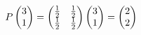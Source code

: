 \documentclass[preview]{standalone}
\begin{document}
\begin{align*}
\special{dvisvgm:raw <g id='unique000'>}P\begin{pmatrix}3\\1\end{pmatrix}=\begin{pmatrix}\frac{1}{2}&\frac{1}{2}\\\frac{1}{2}&\frac{1}{2}\end{pmatrix}\begin{pmatrix}3\\1\end{pmatrix}=\begin{pmatrix}2\\2\end{pmatrix}\special{dvisvgm:raw </g>}
\end{align*}
\end{document}
